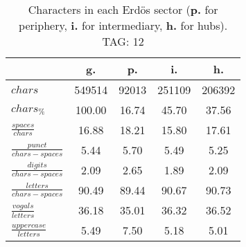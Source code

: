 \begin{table}[h!]
\begin{center}
\begin{tabular}{| l || c | c | c | c |}\hline
 & {\bf g.} & {\bf p.} & {\bf i.} & {\bf h.} \\\hline\hline
$chars$ & 549514  & 92013  & 251109  & 206392 \\
$chars_{\%}$ & 100.00  & 16.74  & 45.70  & 37.56 \\\hline
$\frac{spaces}{chars}$ & 16.88  & 18.21  & 15.80  & 17.61 \\
$\frac{punct}{chars-spaces}$ & 5.44  & 5.70  & 5.49  & 5.25 \\
$\frac{digits}{chars-spaces}$ & 2.09  & 2.65  & 1.89  & 2.09 \\\hline
$\frac{letters}{chars-spaces}$ & 90.49  & 89.44  & 90.67  & 90.73 \\
$\frac{vogals}{letters}$ & 36.18  & 35.01  & 36.32  & 36.52 \\
$\frac{uppercase}{letters}$ & 5.49  & 7.50  & 5.18  & 5.01 \\\hline
\end{tabular}
\caption{Characters in each Erd\"os sector ({{\bf p.}} for periphery, {{\bf i.}} for intermediary, 
    {{\bf h.}} for hubs). TAG: 12}
\end{center}
\end{table}